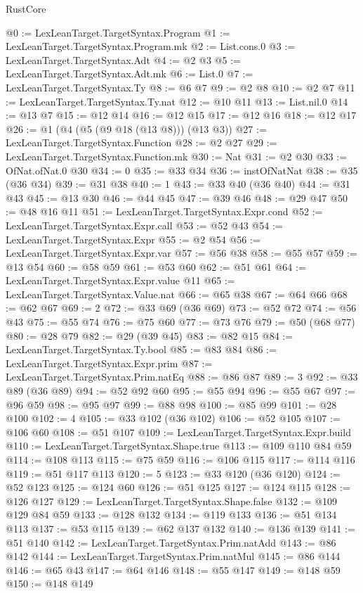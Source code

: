 \begin{lexlean}{RustCore}
\begin{coremodule}
@0 := LexLeanTarget.TargetSyntax.Program
@1 := LexLeanTarget.TargetSyntax.Program.mk
@2 := List.cons.{0}
@3 := LexLeanTarget.TargetSyntax.Adt
@4 := @2 @3
@5 := LexLeanTarget.TargetSyntax.Adt.mk
@6 := List.{0}
@7 := LexLeanTarget.TargetSyntax.Ty
@8 := @6 @7
@9 := @2 @8
@10 := @2 @7
@11 := LexLeanTarget.TargetSyntax.Ty.nat
@12 := @10 @11
@13 := List.nil.{0}
@14 := @13 @7
@15 := @12 @14
@16 := @12 @15
@17 := @12 @16
@18 := @12 @17
@26 := @1 (@4 (@5 (@9 @18 (@13 @8))) (@13 @3))
@27 := LexLeanTarget.TargetSyntax.Function
@28 := @2 @27
@29 := LexLeanTarget.TargetSyntax.Function.mk
@30 := Nat
@31 := @2 @30
@33 := OfNat.ofNat.{0} @30
@34 := 0
@35 := @33 @34
@36 := instOfNatNat
@38 := @35 (@36 @34)
@39 := @31 @38
@40 := 1
@43 := @33 @40 (@36 @40)
@44 := @31 @43
@45 := @13 @30
@46 := @44 @45
@47 := @39 @46
@48 := @29 @47
@50 := @48 @16 @11
@51 := LexLeanTarget.TargetSyntax.Expr.cond
@52 := LexLeanTarget.TargetSyntax.Expr.call
@53 := @52 @43
@54 := LexLeanTarget.TargetSyntax.Expr
@55 := @2 @54
@56 := LexLeanTarget.TargetSyntax.Expr.var
@57 := @56 @38
@58 := @55 @57
@59 := @13 @54
@60 := @58 @59
@61 := @53 @60
@62 := @51 @61
@64 := LexLeanTarget.TargetSyntax.Expr.value @11
@65 := LexLeanTarget.TargetSyntax.Value.nat
@66 := @65 @38
@67 := @64 @66
@68 := @62 @67
@69 := 2
@72 := @33 @69 (@36 @69)
@73 := @52 @72
@74 := @56 @43
@75 := @55 @74
@76 := @75 @60
@77 := @73 @76
@79 := @50 (@68 @77)
@80 := @28 @79
@82 := @29 (@39 @45)
@83 := @82 @15
@84 := LexLeanTarget.TargetSyntax.Ty.bool
@85 := @83 @84
@86 := LexLeanTarget.TargetSyntax.Expr.prim
@87 := LexLeanTarget.TargetSyntax.Prim.natEq
@88 := @86 @87
@89 := 3
@92 := @33 @89 (@36 @89)
@94 := @52 @92 @60
@95 := @55 @94
@96 := @55 @67
@97 := @96 @59
@98 := @95 @97
@99 := @88 @98
@100 := @85 @99
@101 := @28 @100
@102 := 4
@105 := @33 @102 (@36 @102)
@106 := @52 @105
@107 := @106 @60
@108 := @51 @107
@109 := LexLeanTarget.TargetSyntax.Expr.build
@110 := LexLeanTarget.TargetSyntax.Shape.true
@113 := @109 @110 @84 @59
@114 := @108 @113
@115 := @75 @59
@116 := @106 @115
@117 := @114 @116
@119 := @51 @117 @113
@120 := 5
@123 := @33 @120 (@36 @120)
@124 := @52 @123
@125 := @124 @60
@126 := @51 @125
@127 := @124 @115
@128 := @126 @127
@129 := LexLeanTarget.TargetSyntax.Shape.false
@132 := @109 @129 @84 @59
@133 := @128 @132
@134 := @119 @133
@136 := @51 @134 @113
@137 := @53 @115
@139 := @62 @137 @132
@140 := @136 @139
@141 := @51 @140
@142 := LexLeanTarget.TargetSyntax.Prim.natAdd
@143 := @86 @142
@144 := LexLeanTarget.TargetSyntax.Prim.natMul
@145 := @86 @144
@146 := @65 @43
@147 := @64 @146
@148 := @55 @147
@149 := @148 @59
@150 := @148 @149

\end{coremodule}
\end{lexlean}

